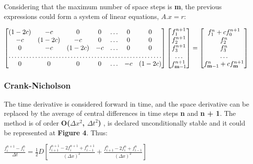 \documentclass[12pt]{article}
\begin{document}
\par Considering that the maximum number of space steps is \textbf{m}, the previous expressions could form a system of linear equations, $A.x = r$:
\begin{center}
$
\begin{bmatrix}
    (1 - 2c) & -c & 0 & 0 & \dots & 0 & 0 \\
    -c & (1 - 2c) & -c & 0 & \dots & 0 & 0 \\
    0 & -c & (1 - 2c) & -c & \dots & 0 & 0 \\
    \hdotsfor{7} \\
    0 & 0 & 0 & 0 & \dots & -c & (1 - 2c) \\
\end{bmatrix}
\begin{bmatrix}
    f_1^{n + 1} \\
    f_2^{n + 1} \\
    f_3^{n + 1} \\
    \dots \\
    f_{\textbf{m} - 1}^{n + 1} \\
\end{bmatrix}
=
\begin{bmatrix}
    f_1^{n} + c f_0^{n + 1} \\
    f_2^{n} \\
    f_3^{n} \\
    \dots \\
    f_{\textbf{m} - 1}^{n} + c f_{\textbf{m}}^{n + 1} \\
\end{bmatrix}
$
\end{center}


\subsubsection*{Crank-Nicholson}
\par The time derivative is considered forward in time, and the space derivative can be replaced by the average of central differences in time steps \textbf{n} and \textbf{n + 1}. The method is of order \textbf{O($\Delta x ^2$, $\Delta t ^2$)} \cite{hoffman}, is declared unconditionally stable and it could be represented at \textbf{Figure 4}. Thus:

\begin{center}
\Large
$
\frac{f_i^{n + 1} - f_i^{n}}{\Delta t} = \frac{1}{2} D {\left[\frac{f_{i + 1}^{n + 1} - 2f_{i}^{n + 1} + f_{i - 1}^{n + 1}}{(\Delta x)^2} + \frac{f_{i + 1}^{n} - 2f_{i}^{n} + f_{i - 1}^{n}}{(\Delta x)^2}\right]}
$
\end{center}
\end{document}
